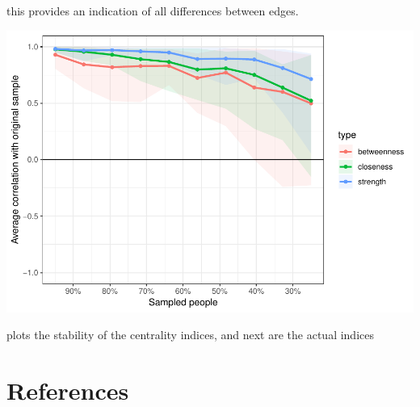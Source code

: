 \documentclass[man,floatsintext]{apa6}
\begin{document}
this provides an indication of all differences between edges.

\includegraphics{script_files/figure-latex/centrality_stability-1.pdf}

plots the stability of the centrality indices, and next are the actual indices

\newpage

\hypertarget{references}{%
\section{References}\label{references}}

\begingroup
\setlength{\parindent}{-0.5in}
\setlength{\leftskip}{0.5in}

\hypertarget{refs}{}

\endgroup
\end{document}

